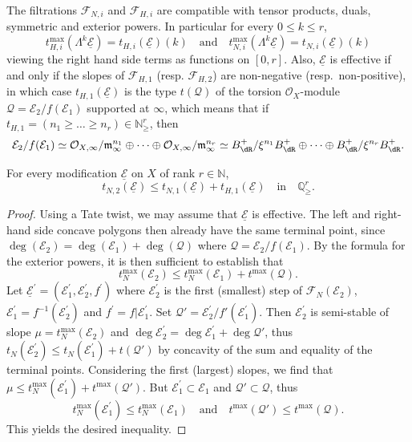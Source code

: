 The filtrations $\mathcal{F}_{N,i}$ and $\mathcal{F}_{H,i}$ are compatible with tensor products, duals, symmetric and exterior powers. In particular for every $0\leq k\leq r$,
\[
t_{H,i}^{\max}(\Lambda^{k}\underline{\mathcal{E}})=t_{H,i}(\underline{\mathcal{E}})(k)\quad\text{and}\quad t_{N,i}^{\max}(\Lambda^{k}\underline{\mathcal{E}})=t_{N,i}(\underline{\mathcal{E}})(k)
\]
viewing the right hand side terms as functions on $[0,r]$. Also, $\underline{\mathcal{E}}$ is effective if and only if the slopes of $\mathcal{F}_{H,1}$ (resp. $\mathcal{F}_{H,2}$) are non-negative (resp.~non-positive), in which case $t_{H,1}(\underline{\mathcal{E}})$ is the type $t(\mathcal{Q})$ of the torsion $\mathcal{O}_{X}$-module $\mathcal{Q}=\mathcal{E}_{2}/f(\mathcal{E}_{1})$ supported at $\infty$, which means that if $t_{H,1}=(n_{1}\geq\dots\geq n_{r})\in\mathbb{N}_{\geq}^{r}$, then
\[
\mathcal{E}_{2}/f(\mathcal{E}_{1})\simeq\mathcal{O}_{X,\infty}/\mathfrak{m}_{\infty}^{n_{1}}\oplus\dots\oplus\mathcal{O}_{X,\infty}/\mathfrak{m}_{\infty}^{n_{r}}\simeq B_{\dR}^{+}/\xi^{n_{1}}B_{\dR}^{+}\oplus\dots\oplus B_{\dR}^{+}/\xi^{n_{r}}B_{\dR}^{+}.
\]

\begin{prop}\label{prop:CompNewtonHodgeModif}
For every modification $\underline{\mathcal{E}}$ on $X$ of rank $r\in\mathbb{N}$,
\[
t_{N,2}(\underline{\mathcal{E}})\leq t_{N,1}(\underline{\mathcal{E}})+t_{H,1}(\underline{\mathcal{E}})\quad\text{in}\quad\mathbb{Q}_{\geq}^{r}.
\]
\end{prop}

\begin{proof}
Using a Tate twist, we may assume that $\underline{\mathcal{E}}$ is effective. The left and right-hand side concave polygons then already have the same terminal point, since $\deg(\mathcal{E}_{2})=\deg(\mathcal{E}_{1})+\deg(\mathcal{Q})$ where $\mathcal{Q}=\mathcal{E}_{2}/f(\mathcal{E}_{1})$. By the formula for the exterior powers, it is then sufficient to establish that
\[
t_{N}^{\max}(\mathcal{E}_{2})\leq t_{N}^{\max}(\mathcal{E}_{1})+t^{\max}(\mathcal{Q}).
\]
Let $\underline{\mathcal{E}}^{\prime}=(\mathcal{E}_{1}^{\prime},\mathcal{E}_{2}^{\prime},f^{\prime})$ where $\mathcal{E}_{2}^{\prime}$ is the first (smallest) step of $\mathcal{F}_{N}(\mathcal{E}_{2})$, $\mathcal{E}_{1}^{\prime}=f^{-1}(\mathcal{E}_{2}^{\prime})$ and $f^{\prime}=f\vert\mathcal{E}_{1}^{\prime}$. Set $\mathcal{Q}'=\mathcal{E}_{2}^{\prime}/f'(\mathcal{E}_{1}^{\prime})$. Then $\mathcal{E}_{2}^{\prime}$ is semi-stable of slope $\mu=t_{N}^{\max}(\mathcal{E}_{2})$ and $\deg\mathcal{E}_{2}^{\prime}=\deg\mathcal{E}_{1}^{\prime}+\deg\mathcal{Q}'$, thus $t_{N}(\mathcal{E}_{2}^{\prime})\leq t_{N}(\mathcal{E}_{1}^{\prime})+t(\mathcal{Q}')$ by concavity of the sum and equality of the terminal points. Considering the first (largest) slopes, we find that $\mu\leq t_{N}^{\max}(\mathcal{E}_{1}^{\prime})+t^{\max}(\mathcal{Q}')$. But $\mathcal{E}_{1}^{\prime}\subset\mathcal{E}_{1}$ and $\mathcal{Q}'\subset\mathcal{Q}$, thus
\[
t_{N}^{\max}(\mathcal{E}_{1}^{\prime})\leq t_{N}^{\max}(\mathcal{E}_{1})\quad\text{and}\quad t^{\max}(\mathcal{Q}')\leq t^{\max}(\mathcal{Q}).
\]
This yields the desired inequality.
\end{proof}

